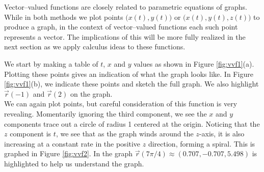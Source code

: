 \enlargethispage{4\baselineskip}
Vector--valued functions are closely related to parametric equations of graphs. While in both methods we plot points $\big(x(t), y(t)\big)$ or $\big(x(t),y(t),z(t)\big)$ to produce a graph, in the context of vector--valued functions each such point represents a vector. The implications of this will be more fully realized in the next section as we apply calculus ideas to these functions.\\

\clearpage

{We start by making a table of $t$, $x$ and $y$ values as shown in Figure \ref{fig:vvf1}(a). Plotting these points gives an indication of what the graph looks like. In Figure \ref{fig:vvf1}(b), we indicate these points and sketch the full graph. We also highlight $\vec r(-1)$ and $\vec r(2)$ on the graph.
}\\

{We can again plot points, but careful consideration of this function is very revealing. Momentarily ignoring the third component, we see the $x$ and $y$ components trace out a circle of radius 1 centered at the origin. Noticing that the $z$ component is $t$, we see that as the graph winds around the $z$-axis, it is also increasing at a constant rate in the positive $z$ direction, forming a spiral. This is graphed in Figure \ref{fig:vvf2}. In the graph $\vec r(7\pi/4)\approx (0.707,-0.707,5.498) $ is highlighted to help us understand the graph.
}\\

